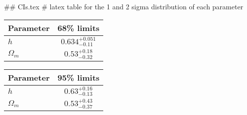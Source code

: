 ## CIs.tex
# latex table for the 1 and 2 sigma distribution of each parameter

\begin{tabular} { l  c}
 Parameter &  68\% limits\\
\hline
{\boldmath$h              $} & $0.634^{+0.051}_{-0.11}    $\\
{\boldmath$\Omega_m       $} & $0.53^{+0.18}_{-0.32}      $\\
\hline
\end{tabular}

\begin{tabular} { l  c}
 Parameter &  95\% limits\\
\hline
{\boldmath$h              $} & $0.63^{+0.16}_{-0.13}      $\\
{\boldmath$\Omega_m       $} & $0.53^{+0.43}_{-0.37}      $\\
\hline
\end{tabular}
